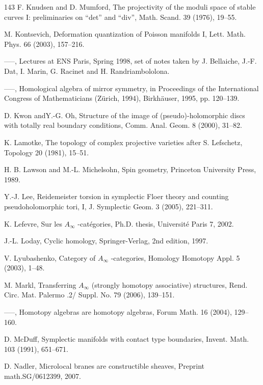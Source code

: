 \begin{thebibliography}{143}
 F. Knudsen and D. Mumford, The projectivity of the moduli space of stable curves I: preliminaries on “det” and “div”, Math. Scand. 39 (1976), 19–55.

 M. Kontsevich, Deformation quantization of Poisson manifolds I, Lett. Math. Phys. 66 (2003), 157–216.

 —–, Lectures at ENS Paris, Spring 1998, set of notes taken by J. Bellaiche, J.-F. Dat, I. Marin, G. Racinet and H. Randriambololona.

 —–, Homological algebra of mirror symmetry, in Proceedings of the International Congress of Mathematicians (Zürich, 1994), Birkhäuser, 1995, pp. 120–139.

 D. Kwon andY.-G. Oh, Structure of the image of (pseudo)-holomorphic discs with totally real boundary conditions, Comm. Anal. Geom. 8 (2000), 31–82.

 K. Lamotke, The topology of complex projective varieties after S. Lefschetz, Topology 20 (1981), 15–51.

 H. B. Lawson and M.-L. Michelsohn, Spin geometry, Princeton University Press, 1989.

 Y.-J. Lee, Reidemeister torsion in symplectic Floer theory and counting pseudoholomorphic tori, I, J. Symplectic Geom. 3 (2005), 221–311.

 K. Lefevre, Sur les \ensuremath{A_\infty} -catégories, Ph.D. thesis, Université Paris 7, 2002.

 J.-L. Loday, Cyclic homology, Springer-Verlag, 2nd edition, 1997.

 V. Lyubashenko, Category of \ensuremath{A_\infty} -categories, Homology Homotopy Appl. 5 (2003), 1–48.

 M. Markl, Transferring \ensuremath{A_\infty} (strongly homotopy associative) structures, Rend. Circ. Mat. Palermo .2/ Suppl. No. 79 (2006), 139–151.

 —–, Homotopy algebras are homotopy algebras, Forum Math. 16 (2004), 129–160.

 D. McDuff, Symplectic manifolds with contact type boundaries, Invent. Math. 103 (1991), 651–671.

 D. Nadler, Microlocal branes are constructible sheaves, Preprint math.SG/0612399, 2007.


\end{thebibliography}
